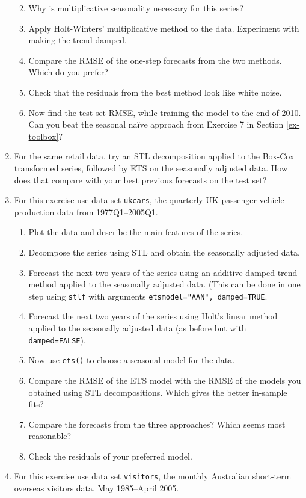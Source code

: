\documentclass[]{book}
\providecommand{\tightlist}{%
  \setlength{\itemsep}{0pt}\setlength{\parskip}{0pt}}
\begin{document}
\begin{enumerate}
  \begin{enumerate}
  \def\labelenumii{\alph{enumii}.}
  \tightlist
  \item
    Why is multiplicative seasonality necessary for this series?
  \item
    Apply Holt-Winters' multiplicative method to the data. Experiment with making the trend damped.
  \item
    Compare the RMSE of the one-step forecasts from the two methods. Which do you prefer?
  \item
    Check that the residuals from the best method look like white noise.
  \item
    Now find the test set RMSE, while training the model to the end of 2010. Can you beat the seasonal naïve approach from Exercise 7 in Section \ref{ex-toolbox}?
  \end{enumerate}
\item
  For the same retail data, try an STL decomposition applied to the Box-Cox transformed series, followed by ETS on the seasonally adjusted data. How does that compare with your best previous forecasts on the test set?
\item
  For this exercise use data set \texttt{ukcars}, the quarterly UK passenger vehicle production data from 1977Q1--2005Q1.

  \begin{enumerate}
  \def\labelenumii{\alph{enumii}.}
  \tightlist
  \item
    Plot the data and describe the main features of the series.
  \item
    Decompose the series using STL and obtain the seasonally adjusted data.
  \item
    Forecast the next two years of the series using an additive damped trend method applied to the seasonally adjusted data. (This can be done in one step using \texttt{stlf} with arguments \texttt{etsmodel="AAN",\ damped=TRUE}.
  \item
    Forecast the next two years of the series using Holt's linear method applied to the seasonally adjusted data (as before but with \texttt{damped=FALSE}).
  \item
    Now use \texttt{ets()} to choose a seasonal model for the data.
  \item
    Compare the RMSE of the ETS model with the RMSE of the models you obtained using STL decompositions. Which gives the better in-sample fits?
  \item
    Compare the forecasts from the three approaches? Which seems most reasonable?
  \item
    Check the residuals of your preferred model.
  \end{enumerate}
\item
  For this exercise use data set \texttt{visitors}, the monthly Australian short-term overseas visitors data, May 1985--April 2005.


\end{enumerate}
\end{document}
